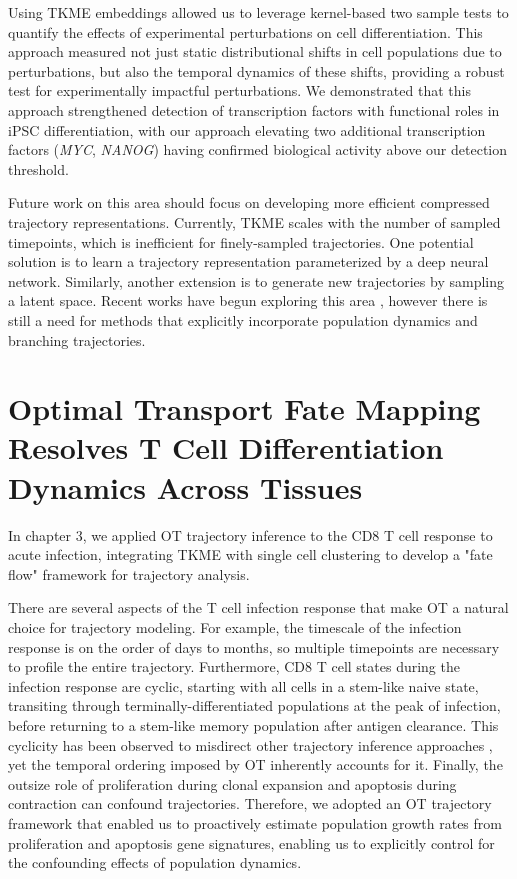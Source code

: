 Using TKME embeddings allowed us to leverage kernel-based two sample tests to quantify the effects of experimental perturbations on cell differentiation. This approach measured not just static distributional shifts in cell populations due to perturbations, but also the temporal dynamics of these shifts, providing a robust test for experimentally impactful perturbations. We demonstrated that this approach strengthened detection of transcription factors with functional roles in iPSC differentiation, with our approach elevating two additional transcription factors (\textit{MYC}, \textit{NANOG}) having confirmed biological activity \citep{ishikawaRENGEInfersGene2023} above our detection threshold. 

Future work on this area should focus on developing more efficient compressed trajectory representations. Currently, TKME scales with the number of sampled timepoints, which is inefficient for finely-sampled trajectories. One potential solution is to learn a trajectory representation parameterized by a deep neural network. Similarly, another extension is to generate new trajectories by sampling a latent space. Recent works have begun exploring this area \citep{xuVISTVariationalInference2026}, however there is still a need for methods that explicitly incorporate population dynamics and branching trajectories.

\section{Optimal Transport Fate Mapping Resolves T Cell Differentiation Dynamics Across Tissues}

In chapter 3, we applied OT trajectory inference to the CD8 T cell response to acute infection, integrating TKME with single cell clustering to develop a "fate flow" framework for trajectory analysis.

There are several aspects of the T cell infection response that make OT a natural choice for trajectory modeling. For example, the timescale of the infection response is on the order of days to months, so multiple timepoints are necessary to profile the entire trajectory. Furthermore, CD8 T cell states during the infection response are cyclic, starting with all cells in a stem-like naive state, transiting through terminally-differentiated populations at the peak of infection, before returning to a stem-like memory population after antigen clearance. This cyclicity has been observed to misdirect other trajectory inference approaches \citep{hudsonTechnologyMeetsTILs2022}, yet the temporal ordering imposed by OT inherently accounts for it. Finally, the outsize role of proliferation during clonal expansion and apoptosis during contraction can confound trajectories. Therefore, we adopted an OT trajectory framework that enabled us to proactively estimate population growth rates from proliferation and apoptosis gene signatures, enabling us to explicitly control for the confounding effects of population dynamics.

